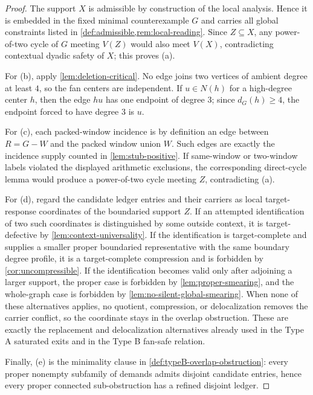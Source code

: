 \documentclass[11pt]{article}
\begin{document}
\begin{proof}
The support $X$ is admissible by construction of the local analysis.  Hence it
is embedded in the fixed minimal counterexample $G$ and carries all global
constraints listed in \cref{def:admissible,rem:local-reading}.  Since
$Z\subseteq X$, any power-of-two cycle of $G$ meeting $V(Z)$ would also meet
$V(X)$, contradicting contextual dyadic safety of $X$; this proves (a).

For (b), apply \cref{lem:deletion-critical}.  No edge joins two vertices of
ambient degree at least $4$, so the fan centers are independent.  If
$u\in N(h)$ for a high-degree center $h$, then the edge $hu$ has one endpoint
of degree $3$; since $d_G(h)\ge4$, the endpoint forced to have degree $3$ is
$u$.

For (c), each packed-window incidence is by definition an edge between
$R=G-W$ and the packed window union $W$.  Such edges are exactly the incidence
supply counted in \cref{lem:stub-positive}.  If same-window or two-window labels
violated the displayed arithmetic exclusions, the corresponding direct-cycle
lemma would produce a power-of-two cycle meeting $Z$, contradicting (a).

For (d), regard the candidate ledger entries and their carriers as local
target-response coordinates of the boundaried support $Z$.  If an attempted
identification of two such coordinates is distinguished by some outside
context, it is target-defective by \cref{lem:context-universality}.  If the
identification is target-complete and supplies a smaller proper boundaried
representative with the same boundary degree profile, it is a target-complete
compression and is forbidden by \cref{cor:uncompressible}.  If the
identification becomes valid only after adjoining a larger support, the proper
case is forbidden by \cref{lem:proper-smearing}, and the whole-graph case is
forbidden by \cref{lem:no-silent-global-smearing}.  When none of these
alternatives applies, no quotient, compression, or delocalization removes the
carrier conflict, so the coordinate stays in the overlap obstruction.  These are
exactly the replacement and delocalization alternatives already used in the Type
A saturated exits and in the Type B fan-safe relation.

Finally, (e) is the minimality clause in
\cref{def:typeB-overlap-obstruction}: every proper nonempty subfamily of
demands admits disjoint candidate entries, hence every proper connected
sub-obstruction has a refined disjoint ledger.
\end{proof}
\end{document}
